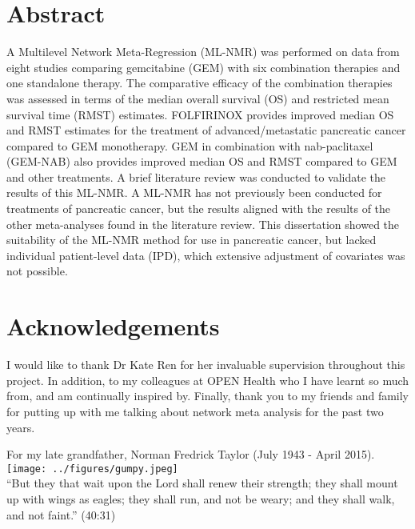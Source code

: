 \documentclass[10pt]{report}
\begin{document}


%

\section*{Abstract}
A Multilevel Network Meta-Regression (ML-NMR) was performed on data from eight studies comparing gemcitabine (GEM) with six combination therapies and one standalone therapy. The comparative efficacy of the combination therapies was assessed in terms of the median overall survival (OS) and restricted mean survival time (RMST) estimates. FOLFIRINOX provides improved median OS and RMST estimates for the treatment of advanced/metastatic pancreatic cancer compared to GEM monotherapy. GEM in combination with nab-paclitaxel (GEM-NAB) also provides improved median OS and RMST compared to GEM and other treatments. 
A brief literature review was conducted to validate the results of this ML-NMR. A ML-NMR has not previously been conducted for treatments of pancreatic cancer, but the results aligned with the results of the other meta-analyses found in the literature review. This dissertation showed the suitability of the ML-NMR method for use in pancreatic cancer, but lacked individual patient-level data (IPD), which extensive adjustment of covariates was not possible.

\section*{Acknowledgements}
I would like to thank Dr Kate Ren for her invaluable supervision throughout this project. In addition, to my colleagues at OPEN Health who I have learnt so much from, and am continually inspired by. Finally, thank you to my friends and family for putting up with me talking about network meta analysis for the past two years.

\clearpage
\begin{center}
  \thispagestyle{empty}
  \vspace*{\fill}
  For my late grandfather, Norman Fredrick Taylor (July 1943 - April 2015).\\
  \texttt{[image: ../figures/gumpy.jpeg]}\\
  ``But they that wait upon the Lord shall renew their strength; they shall mount up with wings as eagles; they shall run, and not be weary; and they shall walk, and not faint.'' (40:31)
  \vspace*{\fill}
\end{center}
\end{document}
